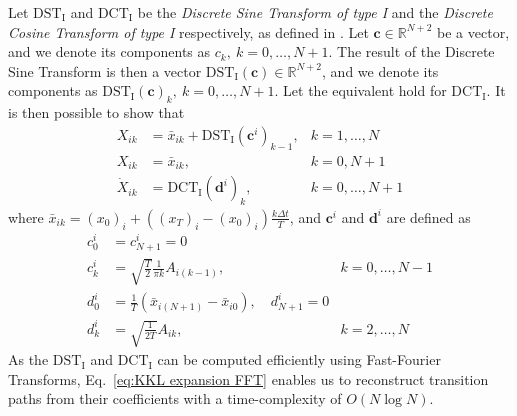 Let $\text{DST}_\text{I}$ and $\text{DCT}_\text{I}$ be the \textit{Discrete Sine Transform of type I} and the \textit{Discrete Cosine Transform of type I} respectively, as defined in \citep{makhoulFastCosineTransform1980, ahmedDiscreteCosineTransform1974}. Let $\mathbf{c} \in \mathbb{R}^{N+2}$ be a vector, and we denote its components as $c_k,\ k=0,\dots, N+1$. The result of the Discrete Sine Transform is then a vector $\text{DST}_\text{I}(\mathbf{c}) \in \mathbb{R}^{N+2}$, and we denote its components as $\text{DST}_\text{I}(\mathbf{c})_k,\ k=0, \dots, N+1$. Let the equivalent hold for $\text{DCT}_\text{I}$. It is then possible to show that
\begin{subequations} \label{eq:KKL expansion FFT}
	\begin{align}
	X_{ik} & = \bar{x}_{ik} + \text{DST}_\text{I} ( \mathbf{c}^i )_{k-1}, & k=1,\dots,N \\
	X_{ik} & = \bar{x}_{ik}, & k=0, N+1 \\
	\dot{X}_{ik} & = \text{DCT}_\text{I} ( \mathbf{d}^i )_k, & k=0,\dots,N+1
	\end{align}
\end{subequations}
where $\bar{x}_{ik} = (x_0)_i + ( (x_T)_i - (x_0)_i) \frac{ k \Delta t}{T}$, and $\mathbf{c}^i$ and $\mathbf{d}^i$ are defined as
\begin{subequations}
	\begin{align}
	c^i_0 & = c^i_{N+1} = 0 \\
	c^i_k & = \sqrt{\frac{T}{2}} \frac{1}{\pi k} A_{i(k-1)}, & k =0,\dots,N-1 \\
	d^i_0 & = \frac{1}{T} ( \bar{x}_{i(N+1)} - \bar{x}_{i0} ), \quad d^i_{N+1} = 0 \\
	d^i_k & = \sqrt{\frac{1}{2 T}} A_{ik}, & k=2,\dots,N 
	\end{align}
\end{subequations}
As the $\text{DST}_\text{I}$ and $\text{DCT}_\text{I}$ can be computed efficiently using Fast-Fourier Transforms, Eq.~\ref{eq:KKL expansion FFT} enables us to reconstruct transition paths from their coefficients with a time-complexity of $O(N \log N)$. 


